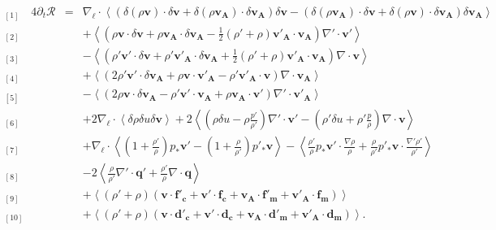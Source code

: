 \begin{equation}
\label{eq:turb_cpi_khm} \boxed{
\begin{array}{lcl}
{}_{[1]} \quad 4\partial_t \mathcal{R} &=& \nabla_{\boldsymbol{\ell}} \cdot \left<\left(\delta \left(\rho\boldsymbol{v}\right) \cdot \delta \boldsymbol{v}+ \delta \left(\rho\boldsymbol{v_A}\right) \cdot \delta \boldsymbol{v_A} \right)\delta \boldsymbol{v}  -\left(\delta \left(\rho\boldsymbol{v_A}\right) \cdot \delta \boldsymbol{v}  + \delta \left(\rho\boldsymbol{v}\right) \cdot \delta \boldsymbol{v_A}  \right) \delta \boldsymbol{v_A} \right>\\
{}_{[2]} && +\left< \left(\rho \boldsymbol{v} \cdot \delta \boldsymbol{v} +\rho \boldsymbol{v_A} \cdot \delta \boldsymbol{v_A} -\frac{1}{2} \left(\rho'+\rho\right) \boldsymbol{v'_A} \cdot \boldsymbol{v_A} \right) \nabla' \cdot \boldsymbol{v'} \right>\\
{}_{[3]} && -\left< \left(\rho' \boldsymbol{v'} \cdot \delta \boldsymbol{v} + \rho' \boldsymbol{v'_A} \cdot \delta \boldsymbol{v_A} + \frac{1}{2} \left(\rho'+\rho\right) \boldsymbol{v'_A} \cdot \boldsymbol{v_A}  \right)\nabla \cdot \boldsymbol{v}\right>\\
{}_{[4]} &&+ \left<\left(2 \rho' \boldsymbol{v'} \cdot \delta \boldsymbol{v_A}+\rho \boldsymbol{v} \cdot \boldsymbol{v'_A} - \rho' \boldsymbol{v'_A} \cdot \boldsymbol{v}  \right)\nabla \cdot \boldsymbol{v_A}\right> \\
{}_{[5]} &&- \left<\left(2\rho \boldsymbol{v} \cdot \delta \boldsymbol{v_A} -\rho' \boldsymbol{v'} \cdot \boldsymbol{v_A} +  \rho \boldsymbol{v_A} \cdot \boldsymbol{v'} \right)\nabla' \cdot \boldsymbol{v'_A}\right> \\
{}_{[6]} &&+ 2 \nabla_{\boldsymbol{\ell}} \cdot \left<\delta \rho  \delta u \delta \boldsymbol{v}\right> + 2\left<\left(\rho \delta u- \rho \frac{p'}{\rho'}\right)\nabla' \cdot \boldsymbol{v'}  - \left(\rho' \delta u + \rho' \frac{p}{\rho}\right) \nabla \cdot \boldsymbol{v} \right>\\
{}_{[7]} &&+  \nabla_{\boldsymbol{\ell}} \cdot \left< \left(1+\frac{\rho'}{\rho}\right)p_*  \boldsymbol{v'} -  \left(1+\frac{\rho}{\rho'}\right)p'_*  \boldsymbol{v} \right>- \left<\frac{\rho'}{\rho} p_*  \boldsymbol{v'} \cdot \frac{\nabla \rho}{\rho} + \frac{\rho}{\rho'} p'_*  \boldsymbol{v} \cdot \frac{\nabla' \rho'}{\rho'} \right>\\
{}_{[8]} &&-2\left<\frac{\rho}{\rho'}  \nabla' \cdot \boldsymbol{q'} + \frac{\rho'}{\rho}  \nabla \cdot \boldsymbol{q}  \right> \\
{}_{[9]}&&+  \left<\left(\rho' + \rho\right)\left(\boldsymbol{v} \cdot \boldsymbol{f'_c} + \boldsymbol{v'} \cdot \boldsymbol{f_c} + \boldsymbol{v_A} \cdot \boldsymbol{f'_m} + \boldsymbol{v'_A} \cdot \boldsymbol{f_m}\right) \right>\\
{}_{[10]}&&+ \left<\left(\rho' + \rho\right)\left(\boldsymbol{v} \cdot \boldsymbol{d'_c} + \boldsymbol{v'} \cdot \boldsymbol{d_c}+\boldsymbol{v_A} \cdot \boldsymbol{d'_m} + \boldsymbol{v'_A} \cdot \boldsymbol{d_m}\right)\right> .
\end{array}}
\end{equation} 
